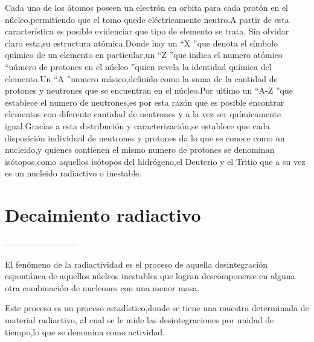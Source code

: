 \documentclass[12pt,fleqn]{book} %
\numberwithin{equation}{section} %
\numberwithin{figure}{section} %
\numberwithin{table}{section} %
\begin{document}
Cada uno de los átomos poseen un electrón en orbita para cada protón en el núcleo,permitiendo que el tomo quede eléctricamente neutro.A partir de esta característica es posible evidenciar que tipo de elemento se trata. Sin olvidar claro esta,su estructura atómica.Donde hay un \textquotedblleft X \textquotedblright  que denota el símbolo químico de un elemento en particular,un \textquotedblleft Z \textquotedblright que indica el numero atómico \textquotedblleft número de protones en el núcleo \textquotedblright quien revela la identidad química del elemento.Un \textquotedblleft A \textquotedblright numero másico,definido como la suma de la cantidad de protones y neutrones que se encuentran en el núcleo.Por ultimo un \textquotedblleft A-Z \textquotedblright que establece el numero de neutrones,es por esta razón que es posible encontrar elementos con diferente cantidad de neutrones y a la vez ser químicamente igual.Gracias a esta distribución y caracterización,se establece que cada disposición individual de neutrones y protones da lo que se conoce como un nucleido,y quienes contienen el mismo numero de protones se denominan isótopos,como aquellos isótopos del hidrógeno,el Deuterio y el Tritio que a su vez es un nucleido radiactivo o inestable.




\section{Decaimiento radiactivo}
--------------------------


El fenómeno de la radiactividad es el proceso de aquella desintegración espontánea de aquellos núcleos inestables que logran descomponerse en alguna otra combinación de nucleones con una menor masa.

Este proceso es un proceso estadístico,donde se tiene una   muestra determinada de  material radiactivo, al cual se le mide las desintegraciones por unidad de tiempo,lo que se denomina como actividad. 
\end{document}
